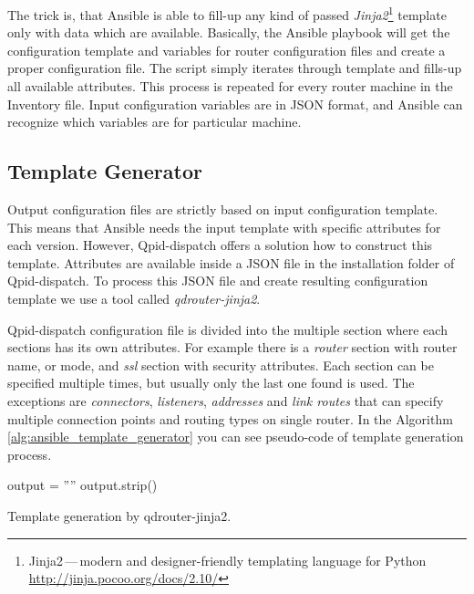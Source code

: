 The trick is, that Ansible is able to fill-up any kind of passed \emph{Jinja2}\footnote{Jinja2\,---\,modern and designer-friendly templating language for Python \url{http://jinja.pocoo.org/docs/2.10/}} template only with data which are available. Basically, the Ansible playbook will get the configuration template and variables for router configuration files and create a proper configuration file. The script simply iterates through template and fills-up all available attributes. This process is repeated for every router machine in the Inventory file. Input configuration variables are in JSON format, and Ansible can recognize which variables are for particular machine.

\subsection{Template Generator}
Output configuration files are strictly based on input configuration template. This means that Ansible needs the input template with specific attributes for each version. However, Qpid-dispatch offers a solution how to construct this template. Attributes are available inside a JSON file in the installation folder of Qpid-dispatch. To process this JSON file and create resulting configuration template we use a tool called \emph{qdrouter-jinja2}\footnotemark{}.


Qpid-dispatch configuration file is divided into the multiple section where each sections has its own attributes. For example there is a \emph{router} section with router name, or mode, and \emph{ssl} section with security attributes. Each section can be specified multiple times, but usually only the last one found is used. The exceptions are \emph{connectors}, \emph{listeners}, \emph{addresses} and \emph{link routes} that can specify multiple connection points and routing types on single router. In the Algorithm \ref{alg:ansible_template_generator} you can see pseudo-code of template generation process.

\begin{center}
	\begin{algorithm}[H]
		\LinesNumbered
		\DontPrintSemicolon


		\var output = ''''\;
		output.strip()\;
		\caption{Template generation by qdrouter-jinja2.}
		\label{alg:ansible_template_generator}
	\end{algorithm}
\end{center}


